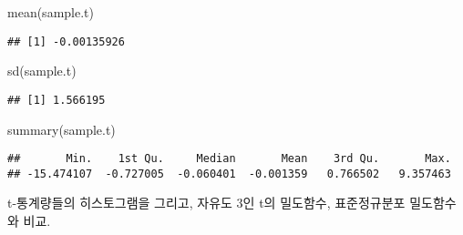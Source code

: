 \documentclass[
]{article}
\newenvironment{Shaded}{\begin{snugshade}}{\end{snugshade}}
\newcommand{\FunctionTok}[1]{\textcolor[rgb]{0.00,0.00,0.00}{#1}}
\newcommand{\NormalTok}[1]{#1}
\begin{document}
\begin{Shaded}
\begin{Highlighting}[]
\FunctionTok{mean}\NormalTok{(sample.t)}
\end{Highlighting}
\end{Shaded}

\begin{verbatim}
## [1] -0.00135926
\end{verbatim}

\begin{Shaded}
\begin{Highlighting}[]
\FunctionTok{sd}\NormalTok{(sample.t)}
\end{Highlighting}
\end{Shaded}

\begin{verbatim}
## [1] 1.566195
\end{verbatim}

\begin{Shaded}
\begin{Highlighting}[]
\FunctionTok{summary}\NormalTok{(sample.t)}
\end{Highlighting}
\end{Shaded}

\begin{verbatim}
##       Min.    1st Qu.     Median       Mean    3rd Qu.       Max. 
## -15.474107  -0.727005  -0.060401  -0.001359   0.766502   9.357463
\end{verbatim}

t-통계량들의 히스토그램을 그리고, 자유도 3인 t의 밀도함수, 표준정규분포
밀도함수와 비교.
\end{document}
